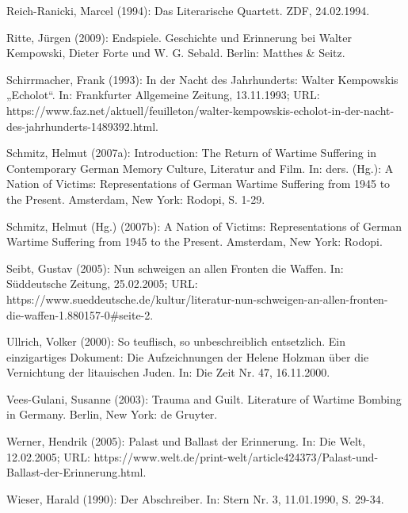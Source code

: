 \begin{multicols*}{2}
\begin{bibdescription}
        \item Reich-Ranicki, Marcel (1994): Das Literarische Quartett. ZDF, 24.02.1994.
        \item Ritte, Jürgen (2009): Endspiele. Geschichte und Erinnerung bei Walter Kempowski, Dieter Forte und W. G. Sebald. Berlin: Matthes \& Seitz.
        \item Schirrmacher, Frank (1993): In der Nacht des Jahrhunderts: Walter Kempowskis „Echolot“. In: Frankfurter Allgemeine Zeitung, 13.11.1993; URL: https://www.faz.net/aktuell/feuilleton/walter-kempowskis-echolot-in-der-nacht-des-jahrhunderts-1489392.html.
        \item Schmitz, Helmut (2007a): Introduction: The Return of Wartime Suffering in Contemporary German Memory Culture, Literatur and Film. In: ders. (Hg.): A Nation of Victims: Representations of German Wartime Suffering from 1945 to the Present. Amsterdam, New York: Rodopi, S. 1-29.
        \item Schmitz, Helmut (Hg.) (2007b): A Nation of Victims: Representations of German Wartime Suffering from 1945 to the Present. Amsterdam, New York: Rodopi.
        \item Seibt, Gustav (2005): Nun schweigen an allen Fronten die Waffen. In: Süddeutsche Zeitung, 25.02.2005; URL: https://www.sueddeutsche.de/kultur/literatur-nun-schweigen-an-allen-fronten-die-waffen-1.880157-0\#seite-2.
        \item Ullrich, Volker (2000): So teuflisch, so unbeschreiblich entsetzlich. Ein einzigartiges Dokument: Die Aufzeichnungen der Helene Holzman über die Vernichtung der litauischen Juden. In: Die Zeit Nr. 47, 16.11.2000.
        \item Vees-Gulani, Susanne (2003): Trauma and Guilt. Literature of Wartime Bombing in Germany. Berlin, New York: de Gruyter.
        \item Werner, Hendrik (2005): Palast und Ballast der Erinnerung. In: Die Welt, 12.02.2005; URL: https://www.welt.de/print-welt/article424373/Palast-und-Ballast-der-Erinnerung.html.
        \item Wieser, Harald (1990): Der Abschreiber. In: Stern Nr. 3, 11.01.1990, S. 29-34.
\end{bibdescription}
\end{multicols*}
